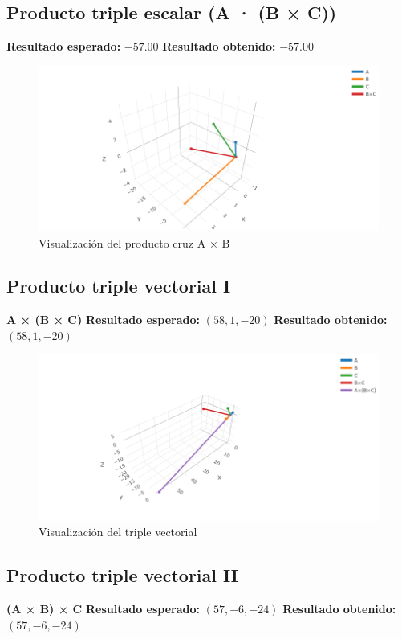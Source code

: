 \documentclass[12pt,a4paper]{article}
\begin{document}
\subsection{Producto triple escalar (A · (B × C))}
\textbf{Resultado esperado:} $-57.00$  
\textbf{Resultado obtenido:} $-57.00$ 
\begin{figure}[H]
    \centering
    \includegraphics[width=1\textwidth]{imagenes/triple_ab.png} %
    \caption{Visualización del producto cruz A × B}
\end{figure}

\subsection{Producto triple vectorial I}
\textbf{A × (B × C)}  
\textbf{Resultado esperado:} $(58, 1, -20)$  
\textbf{Resultado obtenido:} $(58, 1, -20)$  

\begin{figure}[H]
    \centering
    \includegraphics[width=1\textwidth]{imagenes/triple_vectorial.png} %
    \caption{Visualización del triple vectorial}
\end{figure}


\subsection{Producto triple vectorial II}
\textbf{(A × B) × C}  
\textbf{Resultado esperado:} $(57, -6, -24)$  
\textbf{Resultado obtenido:} $(57, -6, -24)$  
\end{document}
